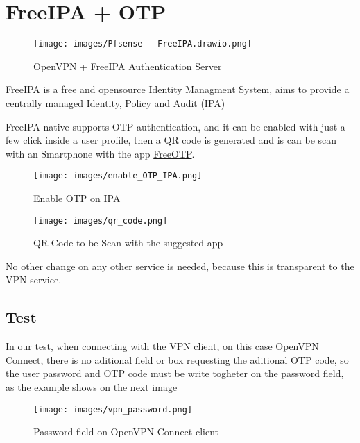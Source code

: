 \newpage

\section{FreeIPA + OTP}

\begin{figure}
  \centering
  \texttt{[image: images/Pfsense - FreeIPA.drawio.png]}
  \caption{OpenVPN + FreeIPA Authentication Server}
  \label{fig:label}
\end{figure}


\href{https://www.freeipa.org}{FreeIPA}   is a free and opensource Identity Managment System, aims to provide a centrally managed Identity, Policy and Audit (IPA)

FreeIPA native supports OTP authentication, and it can be enabled with just a few click inside a user profile, then a QR code is generated and is can be scan with an Smartphone with the app 
 \href{https://freeotp.github.io/ }{FreeOTP}.

\begin{figure}
    \centering
    \texttt{[image: images/enable\_OTP\_IPA.png]}
    \caption{Enable OTP on IPA}
    \label{fig:label}
\end{figure}

\newpage

\begin{figure}
    \centering
    \texttt{[image: images/qr\_code.png]}
    \caption{QR Code to be Scan with the suggested app}
    \label{fig:label}
\end{figure}

No other change on any other service is needed, because this is transparent to the VPN service.

\newpage
\subsection{Test}

In our test, when connecting with the VPN client, on this case OpenVPN Connect, there is no aditional field or box requesting the aditional OTP code, so the user password and OTP code must be write togheter on the password field, as the example shows on the next image

\begin{figure}
    \centering
    \texttt{[image: images/vpn\_password.png]}
    \caption{Password field on OpenVPN Connect client}
    \label{fig:label}
\end{figure}

